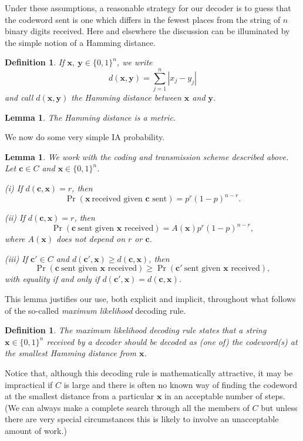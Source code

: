 \documentclass[12pt,a4paper]{article}
\theoremstyle{plain}
\newtheorem{lemma}[theorem]{Lemma}
\newtheorem{definition}[theorem]{Definition}
\theoremstyle{definition}
\begin{document}
    Under these
    assumptions, a reasonable strategy for our decoder
    is to guess
    that the codeword sent is one which differs
    in the fewest places from the string of $n$
    binary digits received. Here and elsewhere
    the discussion can be illuminated by the
    simple notion of a Hamming distance.
    \begin{definition}
        If $\mathbf{x},\ \mathbf{y}\in \{0,1\}^{n}$,
        we write
        \[d(\mathbf{x},\mathbf{y})=\sum_{j=1}^{n}|x_{j}-y_{j}|\]
        and call $d(\mathbf{x},\mathbf{y})$ the Hamming distance between
        $\mathbf{x}$ and $\mathbf{y}$.
    \end{definition}
    \begin{lemma}
        The Hamming distance is a metric.
    \end{lemma}
    We now do some very simple IA probability.
    \begin{lemma}
        We work with the coding and transmission scheme
        described above.
        Let ${\mathbf c}\in C$ and ${\mathbf x}\in \{0,1\}^{n}$.

        (i) If $d({\mathbf c},{\mathbf x})=r$, then
        \[\Pr({\mathbf x}\ \text{received given
        ${\mathbf c}$ sent})=p^{r}(1-p)^{n-r}.\]

        (ii)  If
        $d({\mathbf c},{\mathbf x})=r$, then
        \[\Pr({\mathbf c}\ \text{sent given
        ${\mathbf x}$ received})=A({\mathbf x})p^{r}(1-p)^{n-r},\]
        where $A({\mathbf x})$ does not depend on $r$ or ${\mathbf c}$.

        (iii) If ${\mathbf c}'\in C$  and
        $d({\mathbf c}',{\mathbf x})\geq d({\mathbf c},{\mathbf x})$,
        then
        \[\Pr({\mathbf c}\ \text{sent given
        ${\mathbf x}$ received})\geq
        \Pr({\mathbf c}'\ \text{sent given
        ${\mathbf x}$ received}),\]
        with equality if and only if
        $d({\mathbf c}',{\mathbf x})=d({\mathbf c},{\mathbf x})$.
    \end{lemma}
    This lemma justifies our use, both explicit
    and implicit, throughout what follows of the so-called
    \emph{maximum likelihood} decoding rule.
    \begin{definition}
        The maximum likelihood decoding
        rule states that a string ${\mathbf x}\in \{0,1\}^{n}$
        received by a decoder should be decoded as
        (one of) the codeword(s) at the smallest
        Hamming distance from ${\mathbf x}$.
    \end{definition}
    Notice that, although this decoding rule is mathematically
    attractive, it may be impractical if $C$ is large
    and there is often no known way of finding the codeword at
    the smallest distance from a particular ${\mathbf x}$
    in an acceptable number of steps.
    (We can always make a complete search through all the
    members of $C$ but unless there are very special circumstances
    this is likely to involve an unacceptable amount of work.)
\end{document}
